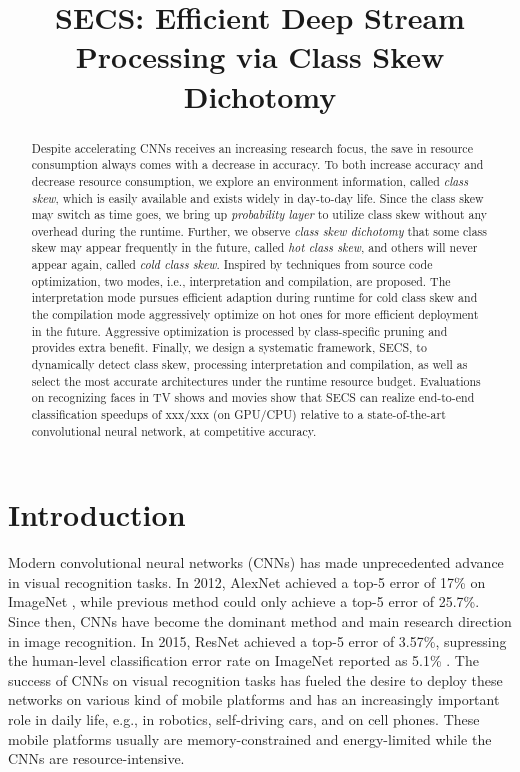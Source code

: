 \documentclass[pageno]{jpaper}
\begin{document}
\title{SECS: Efficient Deep Stream Processing via Class Skew Dichotomy}
\author{}
\date{}
\maketitle

\thispagestyle{empty}

\begin{abstract}
Despite accelerating CNNs receives an increasing research focus, the save in resource consumption always comes with a decrease in accuracy. To both increase accuracy and decrease resource consumption, we explore an environment information, called \textit{class skew}, which is easily available and exists widely in day-to-day life. Since the class skew may switch as time goes, we bring up \textit{probability layer} to utilize class skew without any overhead during the runtime. Further, we observe \textit{class skew dichotomy} that some class skew may appear frequently in the future, called \textit{hot class skew}, and others will never appear again, called \textit{cold class skew}. Inspired by techniques from source code optimization, two modes, i.e., interpretation and compilation, are proposed. The interpretation mode pursues efficient adaption during runtime for cold class skew and the compilation mode aggressively optimize on hot ones for more efficient deployment in the future. Aggressive optimization is processed by class-specific pruning and provides extra benefit. Finally, we design a systematic framework, SECS, to dynamically detect class skew, processing interpretation and compilation, as well as select the most accurate architectures under the runtime resource budget. Evaluations on recognizing faces in TV shows and movies show that SECS can realize end-to-end classification speedups of xxx/xxx (on GPU/CPU) relative to a state-of-the-art convolutional neural network, at competitive accuracy.
\end{abstract}




\section{Introduction} \label{Introduction}

Modern convolutional neural networks (CNNs) has made unprecedented advance in visual recognition tasks. In 2012, AlexNet \cite{krizhevsky2012imagenet} achieved a top-5 error of 17\% on ImageNet \cite{deng2009imagenet}, while previous method could only achieve a top-5 error of 25.7\%. Since then, CNNs have become the dominant method and main research direction in image recognition. In 2015, ResNet \cite{he2016deep} achieved a top-5 error of 3.57\%, supressing the human-level classification error rate on ImageNet reported as 5.1\% \cite{russakovsky2015imagenet}. The success of CNNs on visual recognition tasks has fueled the desire to deploy these networks on various kind of mobile platforms and has an increasingly important role in daily life, e.g., in robotics, self-driving cars, and on cell phones. These mobile platforms usually are memory-constrained and energy-limited while the CNNs are resource-intensive.
\end{document}
